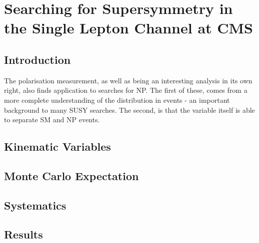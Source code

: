 \chapter{Searching for Supersymmetry in the Single Lepton Channel at CMS}
\section{Introduction}
The \PW polarisation measurement, as well as being an interesting analysis in
its own right, also finds application to searches for \acl{NP}. The first of
these, comes from a more complete understanding of the \MET distribution in
\Wjets events - an important background to many \ac{SUSY} searches. The second,
is that the \LP variable itself is able to separate \ac{SM} and \ac{NP} events.

\section{Kinematic Variables}

\section{Monte Carlo Expectation}
\section{Systematics}
\section{Results}
